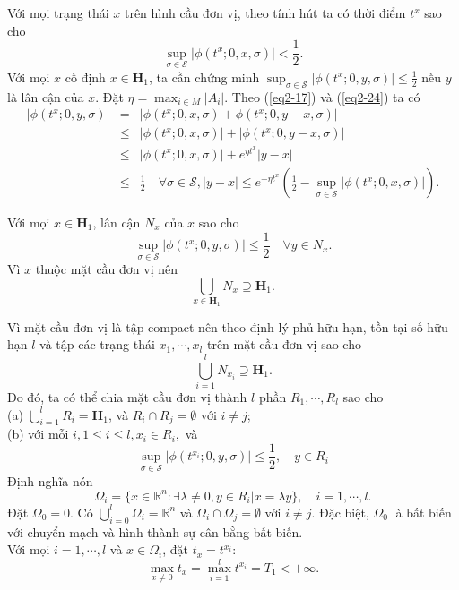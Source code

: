 \documentclass[14pt,a4paper,oneside]{report}		%
\begin{document}
Với mọi trạng thái $x$ trên hình cầu đơn vị, theo tính hút ta có thời điểm $t^x$ sao cho
\begin{equation} \label{eq2-24}
\sup_{\sigma\in\mathcal{S}}|\phi(t^x;0,x,\sigma)|<\frac{1}{2}.
\end{equation}
Với mọi $x$ cố định $x\in\mathbf{H}_1$, ta cần chứng minh $\sup_{\sigma\in\mathcal{S}}|\phi(t^x;0,y,\sigma)|\leq\frac{1}{2}$ nếu $y$ là lân cận của $x$. Đặt $\eta = \max_{i\in M}|A_i|$. Theo (\ref{eq2-17}) và (\ref{eq2-24}) ta có
$$
\begin{array}{lcl}|\phi (t^x;0,y,\sigma)|&
=& |\phi(t^x;0,x,\sigma) + \phi(t^x;0,y-x,\sigma)|\\
&\leq & |\phi(t^x;0,x,\sigma)| + |\phi(t^x;0,y-x,\sigma)|\\
&\leq &|\phi(t^x;0,x,\sigma)| + e^{\eta t^x}|y-x|\\
&\leq &\frac{1}{2}\quad\forall\sigma\in\mathcal{S}, |y-x|\leq e^{-\eta t^x}(\frac{1}{2}-\sup_{\sigma\in\mathcal{S}}|\phi(t^x;0,x,\sigma)|).
\end{array}
$$

Với mọi $x\in\mathbf{H}_1$, lân cận $N_x$ của $x$ sao cho
$$\sup_{\sigma\in\mathcal{S}}|\phi (t^x;0,y,\sigma)| \leq\frac{1}{2}\quad\forall y\in N_x.$$
Vì $x$ thuộc mặt cầu đơn vị nên
$$\bigcup_{x\in\mathbf{H}_1}N_x \supseteq \mathbf{H}_1.$$

Vì mặt cầu đơn vị là tập compact nên theo định lý phủ hữu hạn, tồn tại số hữu hạn $l$ và tập các trạng thái $x_1,\cdots,x_l$ trên mặt cầu đơn vị sao cho 
$$\bigcup_{i=1}^lN_{x_i} \supseteq \mathbf{H}_1.$$
Do đó, ta có thể chia mặt cầu đơn vị thành $l$ phần $R_1,\cdots,R_l$ sao cho\\
(a) $\bigcup_{i=1}^lR_i=\mathbf{H}_1$, và $R_i\cap R_j=\emptyset$ với $i\neq j$;\\
(b) với mỗi $i, 1\leq i\leq l,x_i\in R_i,$ và
$$\sup_{\sigma\in\mathcal{S}}|\phi(t^{x_i};0,y,\sigma)|\leq\frac{1}{2}, \quad y\in R_i$$
Định nghĩa nón
$$\Omega_i = \{x\in\mathbb{R}^n:\exists\lambda\neq 0, y\in R_i | x=\lambda y\}, \quad i=1,\cdots,l.$$
Đặt $\Omega_0={0}$. Có $\bigcup_{i=0}^l\Omega_i=\mathbb{R}^n$ và $\Omega_i \cap \Omega_j = \emptyset$ với $i\neq j$. Đặc biệt, $\Omega_0$ là bất biến với chuyển mạch và hình thành sự cân bằng bất biến.\\

Với mọi $i=1,\cdots,l$ và $x\in\Omega_i$, đặt $t_x = t^{x_i}$:
\begin{equation} \label{eq2-25}
\max_{x\neq 0}t_x = \max_{i=1}^lt^{x_i}=T_1 <+\infty.
\end{equation}
\end{document}
